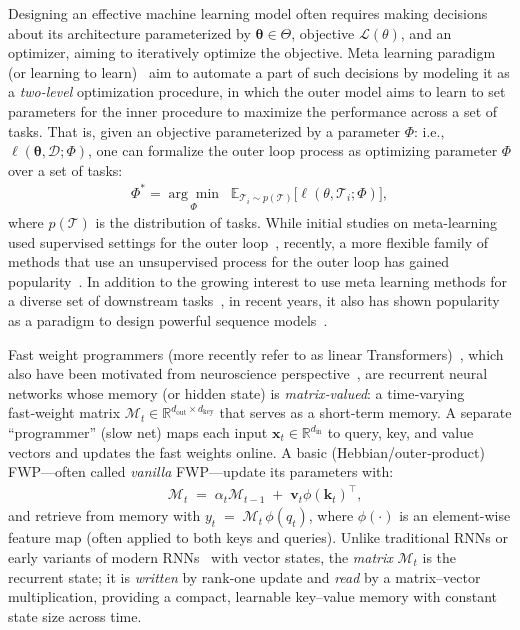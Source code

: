 \documentclass{article}
\newcommand{\vv}{\mathbf{v}}
\newcommand{\citep}{\parencite}
\newcommand{\M}[0]{\mathcal{M}}
\newcommand{\head}[1]{\vspace{1.7mm}\noindent{{\textcolor{c4}{\bf #1.}}}}
\newcommand{\vk}{\boldsymbol{k}}
\renewcommand{\vv}{\boldsymbol{v}}
\begin{document}
\head{Meta Learning}
Designing an effective machine learning model often requires making decisions about its architecture parameterized by $\boldsymbol{\theta} \in \Theta$, objective $\mathcal{L}(\theta)$, and an optimizer, aiming to iteratively optimize the objective. Meta learning paradigm (or learning to learn)~\citep{schmidhuber1996simple, finn2017model, akyurek2022learning, irie2025metalearning} aim to automate a part of such decisions by modeling it as a \emph{two-level} optimization procedure, in which the outer model aims to learn to set parameters for the inner procedure to maximize the performance across a set of tasks. That is, given an objective parameterized by a parameter $\Phi$: i.e., $\ell(\boldsymbol{\theta}, \mathcal{D}; \Phi)$, one can formalize the outer loop process as optimizing parameter $\Phi$ over a set of tasks:
\begin{align}
    \Phi^{\ast} =
\underset{\Phi}{\arg\min}
\;\;
\mathbb{E}_{\mathcal{T}_i \sim p(\mathcal{T})}
\Biggl[
    \ell(\theta, \mathcal{T}_i; \Phi)
\Biggr],
\end{align}
where $p(\mathcal{T})$ is the distribution of tasks. While initial studies on meta-learning used supervised settings for the outer loop~\citep{schmidhuber1996simple}, recently, a more flexible family of methods that use an unsupervised process for the outer loop has gained popularity~\citep{brown2020language, chen2022meta, qu2025optimizing, finn2017model, akyurek2022learning}. In addition to the growing interest to use meta learning methods for a diverse set of downstream tasks~\citep{finn2017model, chen2022meta, qu2025optimizing, munkhdalai2019metalearned, irie2025metalearning}, in recent years, it also has shown popularity as a paradigm to design powerful sequence models~\citep{sun2024learning, behrouz2025Miras, behrouz2024titans}.

\head{Fast Weight Programmers (FWPs)}
Fast weight programmers (more recently refer to as linear Transformers)~\citep{schmidhuber1992learning, hinton1987using, ba2016using, schlag2021linear}, which also have been motivated from neuroscience perspective~\citep{gershman2025key}, are recurrent neural networks whose memory (or hidden state) is \emph{matrix‑valued}: a time‑varying fast‑weight matrix $\M_t\in\mathbb{R}^{d_{\mathrm{out}}\times d_{\mathrm{key}}}$ that serves as a short‑term memory. A separate “programmer” (slow net) maps each input $\boldsymbol{x}_t\in\mathbb{R}^{d_{\mathrm{in}}}$ to query, key, and value vectors and updates the fast weights online. A basic (Hebbian/outer‑product) FWP—often called \emph{vanilla} FWP—update its parameters with:
\begin{align}
    &\M_t \;=\; \alpha_t \M_{t-1} \;+\; \vv_t \phi(\vk_t)^{\top},
\end{align}
and retrieve from memory with $y_t \;=\; \M_t\,\phi(q_t)$, where $\phi(\cdot)$ is an element-wise feature map (often applied to both keys and queries). Unlike traditional RNNs or early variants of modern RNNs~\citep{LSTM, botev2024recurrentgemma, sun2023retentive} with vector states, the \emph{matrix} $\M_t$ is the recurrent state; it is \emph{written} by rank‑one update and \emph{read} by a matrix–vector multiplication, providing a compact, learnable key–value memory with constant state size across time.
\end{document}
